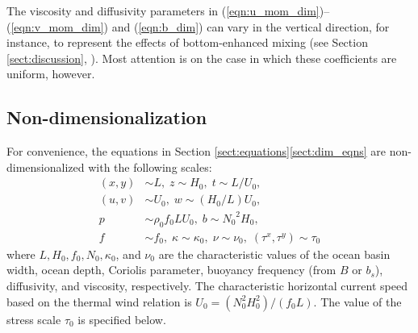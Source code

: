 \documentclass{ametsocV6.2}
\begin{document}
The viscosity and diffusivity parameters in (\ref{eqn:u_mom_dim})--(\ref{eqn:v_mom_dim}) and (\ref{eqn:b_dim}) can vary in the vertical direction, for instance, to represent the effects of bottom-enhanced mixing (see Section \ref{sect:discussion}, \citealt{peterson&callies23,peterson&callies26}).
Most attention is on the case in which these coefficients are uniform, however.

\subsection{Non-dimensionalization}
\label{sect:non-dimensionalization}
For convenience, the equations in Section \ref{sect:equations}\ref{sect:dim_eqns} are non-dimensionalized with the following scales:
\begin{align}
    (x, y) &\sim L,\; z \sim H_0,\; t \sim L / U_0 ,\nonumber \\
    (u,v) &\sim U_0,\; w \sim (H_0 / L) U_0, \nonumber \\
     p &\sim \rho_0 f_0 L U_0 ,\; b \sim {N_0}^2 H_0, \nonumber \\
    f &\sim f_0,\; \kappa \sim \kappa_0, \; \nu \sim \nu_0, \; (\tau^x, \tau^y) \sim \tau_0 \nonumber
\end{align}
where $L, H_0, f_0, N_0, \kappa_0$, and $\nu_0$ are the characteristic values of the ocean basin width, ocean depth, Coriolis parameter, buoyancy frequency (from $B$ or $b_s$), diffusivity, and viscosity, respectively.
The characteristic horizontal current speed based on the thermal wind relation is $U_0 = ( N_0^2 H_0^2)/(f_0 L)$.
The value of the stress scale $\tau_0$ is specified below.
\end{document}
